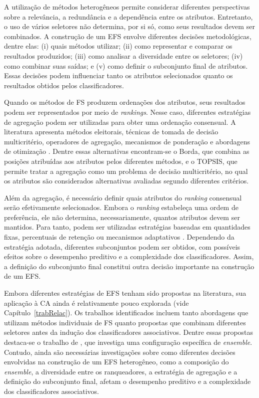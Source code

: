 A utilização de métodos heterogêneos permite considerar diferentes perspectivas sobre a relevância, a redundância e a dependência entre os atributos. Entretanto, o uso de vários seletores não determina, por si só, como seus resultados devem ser combinados. A construção de um EFS envolve diferentes decisões metodológicas, dentre elas: (i) quais métodos utilizar; (ii) como representar e comparar os resultados produzidos; (iii) como analisar a diversidade entre os seletores; (iv) como combinar suas saídas; e (v) como definir o subconjunto final de atributos. Essas decisões podem influenciar tanto os atributos selecionados quanto os resultados obtidos pelos classificadores.

Quando os métodos de FS produzem ordenações dos atributos, seus resultados podem ser representados por meio de \textit{rankings}. Nesse caso, diferentes estratégias de agregação podem ser utilizadas para obter uma ordenação consensual. A literatura apresenta métodos eleitorais, técnicas de tomada de decisão multicritério, operadores de agregação, mecanismos de ponderação e abordagens de otimização \cite{drotar2019ensemble,hashemi2021pareto,abasabadi2021automatic,abellana2022ensemble,kaur2023mcdm}. Dentre essas alternativas encontram-se o Borda, que combina as posições atribuídas aos atributos pelos diferentes métodos, e o TOPSIS, que permite tratar a agregação como um problema de decisão multicritério, no qual os atributos são considerados alternativas avaliadas segundo diferentes critérios.

Além da agregação, é necessário definir quais atributos do \textit{ranking} consensual serão efetivamente selecionados. Embora o \textit{ranking} estabeleça uma ordem de preferência, ele não determina, necessariamente, quantos atributos devem ser mantidos. Para tanto, podem ser utilizadas estratégias baseadas em quantidades fixas, percentuais de retenção ou mecanismos adaptativos \cite{seijopardo2019automatic}. Dependendo da estratégia adotada, diferentes subconjuntos podem ser obtidos, com possíveis efeitos sobre o desempenho preditivo e a complexidade dos classificadores. Assim, a definição do subconjunto final constitui outra decisão importante na construção de um EFS.

Embora diferentes estratégias de EFS tenham sido propostas na literatura, sua aplicação à CA ainda é relativamente pouco explorada (vide Capítulo~\ref{trabRelac}). Os trabalhos identificados incluem tanto abordagens que utilizam métodos individuais de FS quanto propostas que combinam diferentes seletores antes da indução dos classificadores associativos. Dentre essas propostas destaca-se o trabalho de , que investiga uma configuração específica de \textit{ensemble}. Contudo, ainda são necessárias investigações sobre como diferentes decisões envolvidas na construção de um EFS heterogêneo, como a composição do \textit{ensemble}, a diversidade entre os ranqueadores, a estratégia de agregação e a definição do subconjunto final, afetam o desempenho preditivo e a complexidade dos classificadores associativos.

